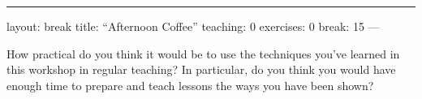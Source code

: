 \begin{center}
\rule{3in}{0.4pt}
\end{center}
layout: break
title: ``Afternoon Coffee''
teaching: 0
exercises: 0
break: 15
---

How practical do you think it would be to use the techniques you've learned in this workshop
in regular teaching?
In particular,
do you think you would have enough time to prepare and teach lessons
the ways you have been shown?

